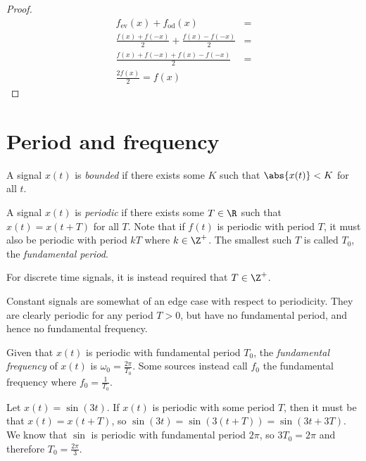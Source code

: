 \documentclass[12pt]{article}
\begin{document}
\begin{proof}
    \begin{align*}
        f_{\mathrm{ev}}(x) + f_{\mathrm{od}}(x) &= \\
        \frac{f(x) + f(-x)}{2} + \frac{f(x) - f(-x)}{2} &= \\
        \frac{f(x) + f(-x) + f(x) - f(-x)}{2} &= \\
        \frac{2f(x)}{2} = f(x)
    \end{align*}
\end{proof}

\section{Period and frequency}

\begin{defn}
    A signal $x(t)$ is \emph{bounded} if there exists some $K$ such that $\abs{x(t)} < K$ for all $t$.
\end{defn}

\begin{defn}
    A signal $x(t)$ is \emph{periodic} if there exists some $T \in \R$ such that $x(t) = x(t + T)$ for all $T$. Note that if $f(t)$ is periodic with period $T$, it must also be periodic with period $kT$ where $k \in \Z^+$. The smallest such $T$ is called $T_0$, the \emph{fundamental period}.
\end{defn}

\begin{rmk}
    For discrete time signals, it is instead required that $T \in \Z^+$.
\end{rmk}

\begin{rmk}
    Constant signals are somewhat of an edge case with respect to periodicity. They are clearly periodic for any period $T > 0$, but have no fundamental period, and hence no fundamental frequency.
\end{rmk}

\begin{defn}
    Given that $x(t)$ is periodic with fundamental period $T_0$, the \emph{fundamental frequency} of $x(t)$ is $\omega_0 = \frac{2\pi}{T_0}$. Some sources instead call $f_0$ the fundamental frequency where $f_0 = \frac{1}{T_0}$.
\end{defn}

\begin{exmp}
    Let $x(t) = \sin(3t)$. If $x(t)$ is periodic with some period $T$, then it must be that $x(t) = x(t + T)$, so $\sin(3t) = \sin(3(t + T)) = \sin(3t + 3T)$. We know that $\sin$ is periodic with fundamental period $2\pi$, so $3T_0 = 2\pi$ and therefore $T_0 = \frac{2\pi}{3}$.
\end{exmp}
\end{document}
